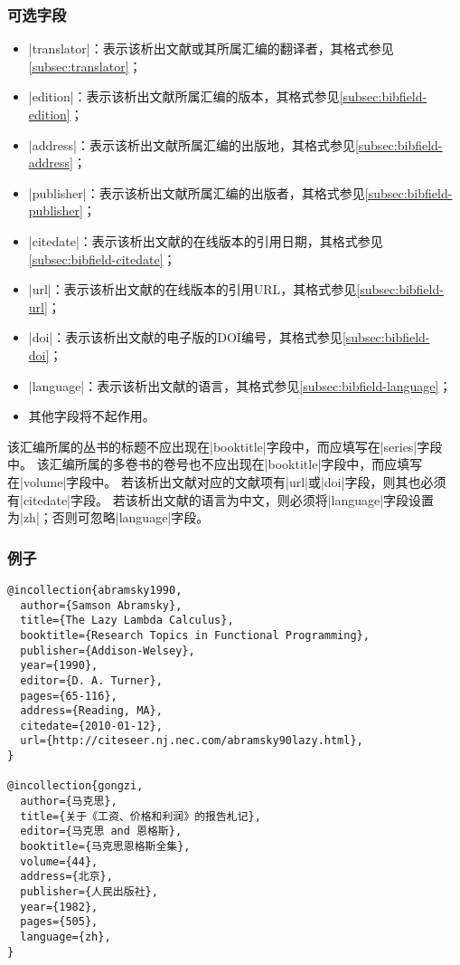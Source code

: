 \subsubsection{可选字段}

\begin{itemize}
\item |translator|：表示该析出文献或其所属汇编的翻译者，其格式参见\ref{subsec:translator}；
\item |edition|：表示该析出文献所属汇编的版本，其格式参见\ref{subsec:bibfield-edition}；
\item |address|：表示该析出文献所属汇编的出版地，其格式参见\ref{subsec:bibfield-address}；
\item |publisher|：表示该析出文献所属汇编的出版者，其格式参见\ref{subsec:bibfield-publisher}；
\item |citedate|：表示该析出文献的在线版本的引用日期，其格式参见\ref{subsec:bibfield-citedate}；
\item |url|：表示该析出文献的在线版本的引用URL，其格式参见\ref{subsec:bibfield-url}；
\item |doi|：表示该析出文献的电子版的DOI编号，其格式参见\ref{subsec:bibfield-doi}；
\item |language|：表示该析出文献的语言，其格式参见\ref{subsec:bibfield-language}；
\item 其他字段将不起作用。
\end{itemize}

\begin{note}
该汇编所属的丛书的标题不应出现在|booktitle|字段中，而应填写在|series|字段中。
该汇编所属的多卷书的卷号也不应出现在|booktitle|字段中，而应填写在|volume|字段中。
若该析出文献对应的文献项有|url|或|doi|字段，则其也必须有|citedate|字段。
若该析出文献的语言为中文，则必须将|language|字段设置为|zh|；否则可忽略|language|字段。
\end{note}

\subsubsection{例子}

\begin{verbatim}
@incollection{abramsky1990,
  author={Samson Abramsky},
  title={The Lazy Lambda Calculus},
  booktitle={Research Topics in Functional Programming},
  publisher={Addison-Welsey},
  year={1990},
  editor={D. A. Turner},
  pages={65-116},
  address={Reading, MA},
  citedate={2010-01-12},
  url={http://citeseer.nj.nec.com/abramsky90lazy.html},
}

@incollection{gongzi,
  author={马克思},
  title={关于《工资、价格和利润》的报告札记},
  editor={马克思 and 恩格斯},
  booktitle={马克思恩格斯全集},
  volume={44},
  address={北京},
  publisher={人民出版社},
  year={1982},
  pages={505},
  language={zh},
}
\end{verbatim}

